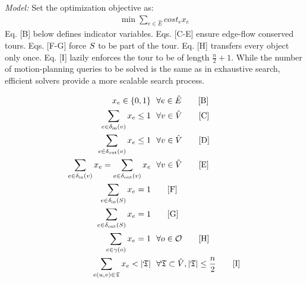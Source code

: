 \textit{Model:} Set the optimization objective as:
\begin{align*}
	\min \sum_{e \in \hat{E}} cost_e x_e \tag*{[A]}
\end{align*}
Eq. [B] below defines indicator variables. Eqs. [C-E] ensure edge-flow conserved tours. Eqs. [F-G] force $S$ to be part of the tour. Eq. [H] transfers every object only once. Eq. [I] lazily enforces the tour to be of length $ \frac{n}{2} + 1 $. While the number of motion-planning queries to be solved is the same as in exhaustive search, efficient {\milp} solvers \cite{gurobi} provide a more scalable search process.

\noindent\begin{minipage}{.48\textwidth}
\begin{align*}
x_e \in \{ 0,1 \}& \ \ \forall e \in \hat{E} \tag*{[B]}\\
\sum_{e\in\delta_{\rm in}(v)} x_e \leq 1& \ \ \forall v\in \hat{V} \tag*{[C]}\\
\sum_{e\in\delta_{\rm out}(v)} x_e \leq 1& \ \ \forall v\in \hat{V} \tag*{[D]}\\
\sum_{e\in\delta_{\rm in}(v)}x_e = \sum_{e\in\delta_{\rm out}(v)}x_e& \ \ \forall v\in \hat{V} \tag*{[E]}\\
\sum_{e\in\delta_{\rm in}(\startq)} x_e = 1& \tag*{[F]}\\
\sum_{e\in\delta_{\rm out}(\startq)} x_e = 1& \tag*{[G]}\\
\sum_{e\in\gamma(\object)} x_e = 1& \ \  \forall \object\in\objectset \tag*{[H]}\\
\sum_{e(u,v)\in \mathfrak{T}} x_e < |\mathfrak{T}| & \ \  \forall \mathfrak{T} \subset \hat{V}, |\mathfrak{T}| \leq \frac{n}{2} \tag*{[I]}
\label{model:milp}
\end{align*}
\end{minipage}

